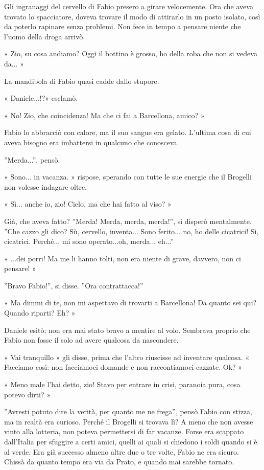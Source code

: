 Gli ingranaggi del cervello di Fabio presero a girare velocemente. Ora che aveva trovato lo spacciatore, doveva trovare il modo di attirarlo in un posto isolato, così da poterlo rapinare senza problemi. Non fece in tempo a pensare niente che l'uomo della droga arrivò.

« Zio, su cosa andiamo? Oggi il bottino è grosso, ho della roba che non si vedeva da... »

La mandibola di Fabio quasi cadde dallo stupore.

« Daniele...!?» esclamò.

« No! Zio, che coincidenza! Ma che ci fai a Barcellona, amico? »

Fabio lo abbracciò con calore, ma il suo sangue era gelato. L'ultima cosa di cui aveva bisogno era imbattersi in qualcuno che conosceva.

''Merda...'', pensò.

« Sono... in vacanza. » rispose, sperando con tutte le sue energie che il Brogelli non volesse indagare oltre.

« Sì... anche io, zio! Cielo, ma che hai fatto al viso? »

Già, che aveva fatto? ''Merda! Merda, merda, merda!'', si disperò mentalmente. ''Che cazzo gli dico? Sù, cervello, inventa... Sono ferito... no, ho delle cicatrici! Sì, cicatrici. Perché... mi sono operato...oh, merda... eh...''

« ...dei porri! Ma me li hanno tolti, non era niente di grave, davvero, non ci pensare! »

''Bravo Fabio!'', si disse. ''Ora contrattacca!''

« Ma dimmi di te, non mi aspettavo di trovarti a Barcellona! Da quanto sei qui? Quando riparti? Eh? »

Daniele esitò; non era mai stato bravo a mentire al volo. Sembrava proprio che Fabio non fosse il solo ad avere qualcosa da nascondere.

« Vai tranquillo » gli disse, prima che l'altro riuscisse ad inventare qualcosa. « Facciamo così: non facciamoci domande e non raccontiamoci cazzate. Ok? »

« Meno male l'hai detto, zio! Stavo per entrare in crisi, paranoia pura, cosa potevo dirti? »

''Avresti potuto dire la verità, per quanto me ne frega'', pensò Fabio con stizza, ma in realtà era curioso. Perché il Brogelli si trovava lì? A meno che non avesse vinto alla lotteria, non poteva permettersi di far vacanze. Forse era scappato dall'Italia per sfuggire a certi amici, quelli ai quali si chiedono i soldi quando si è al verde. Era già successo almeno altre due o tre volte, Fabio ne era sicuro. Chissà da quanto tempo era via da Prato, e quando mai sarebbe tornato.

